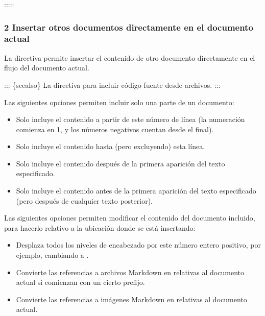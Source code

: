 \documentclass[a4paper,10pt,spanish]{sphinxmanual}
\begin{document}
\sphinxAtStartPar
:::::


\subsubsection{2 Insertar otros documentos directamente en el documento actual}
\label{\detokenize{configuracion_inicial/013.guia_de_myst_parser:insertar-otros-documentos-directamente-en-el-documento-actual}}
\sphinxAtStartPar
La directiva  permite insertar el contenido de otro documento directamente en el flujo del documento actual.

\sphinxAtStartPar
::: \{seealso\}
La directiva {\hyperref[\detokenize{configuracion_inicial/013.guia_de_myst_parser:syntax/literalinclude}]{}} para incluir código fuente desde archivos.
:::

\sphinxAtStartPar
Las siguientes opciones permiten incluir solo una parte de un documento:
\begin{itemize}
\item {} 
\sphinxAtStartPar
{} Solo incluye el contenido a partir de este número de línea (la numeración comienza en 1, y los números negativos cuentan desde el final).

\item {} 
\sphinxAtStartPar
{} Solo incluye el contenido hasta (pero excluyendo) esta línea.

\item {} 
\sphinxAtStartPar
{} Solo incluye el contenido después de la primera aparición del texto especificado.

\item {} 
\sphinxAtStartPar
{} Solo incluye el contenido antes de la primera aparición del texto especificado (pero después de cualquier texto posterior).

\end{itemize}

\sphinxAtStartPar
Las siguientes opciones permiten modificar el contenido del documento incluido, para hacerlo relativo a la ubicación donde se está insertando:
\begin{itemize}
\item {} 
\sphinxAtStartPar
{} Desplaza todos los niveles de encabezado por este número entero positivo, por ejemplo, cambiando \sphinxcode{\sphinxupquote{\#}} a \sphinxcode{\sphinxupquote{\#\#\#\#}}.

\item {} 
\sphinxAtStartPar
{} Convierte las referencias a archivos Markdown en relativas al documento actual si comienzan con un cierto prefijo.

\item {} 
\sphinxAtStartPar
{} Convierte las referencias a imágenes Markdown en relativas al documento actual.

\end{itemize}
\end{document}
